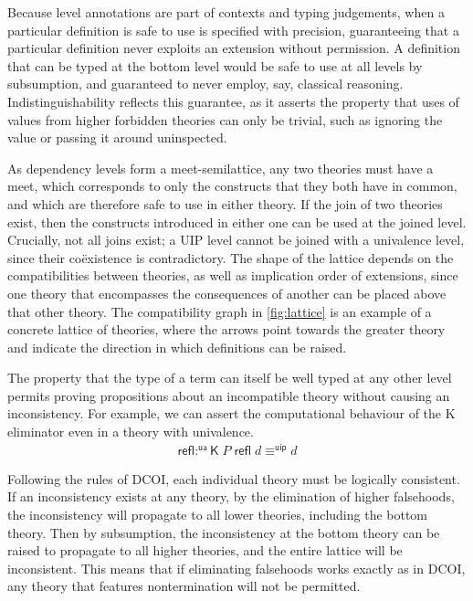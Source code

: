 \documentclass{article}
\newcommand{\kw}[1]{\mathsf{#1}}
\begin{document}
Because level annotations are part of contexts and typing judgements,
when a particular definition is safe to use is specified with precision,
guaranteeing that a particular definition never exploits an extension without permission.
A definition that can be typed at the bottom level
would be safe to use at all levels by subsumption,
and guaranteed to never employ, say, classical reasoning.
Indistinguishability reflects this guarantee, as it asserts the property that
uses of values from higher forbidden theories can only be trivial,
such as ignoring the value or passing it around uninspected.

As dependency levels form a meet-semilattice,
any two theories must have a meet,
which corresponds to only the constructs that they both have in common,
and which are therefore safe to use in either theory.
If the join of two theories exist,
then the constructs introduced in either one can be used at the joined level.
Crucially, not all joins exist; a UIP level cannot be joined with a univalence level,
since their co\"existence is contradictory.
The shape of the lattice depends on the compatibilities between theories,
as well as implication order of extensions,
since one theory that encompasses the consequences of another
can be placed above that other theory.
The compatibility graph in \cref{fig:lattice}
is an example of a concrete lattice of theories,
where the arrows point towards the greater theory
and indicate the direction in which definitions can be raised.

The property that the type of a term can itself be well typed at any other level
permits proving propositions about an incompatible theory
without causing an inconsistency.
For example, we can assert the computational behaviour of the K eliminator
even in a theory with univalence.
%
\vspace{-\baselineskip}
\begin{align*}
  \kw{refl} :^{\kw{ua}} \kw{K} \; P \; \kw{refl} \; d \equiv^{\kw{uip}} d
\end{align*}
\vspace{-1.5\baselineskip}

Following the rules of DCOI,
each individual theory must be logically consistent.
If an inconsistency exists at any theory,
by the elimination of higher falsehoods,
the inconsistency will propagate to all lower theories, including the bottom theory.
Then by subsumption, the inconsistency at the bottom theory
can be raised to propagate to all higher theories,
and the entire lattice will be inconsistent.
This means that if eliminating falsehoods works exactly as in DCOI,
any theory that features nontermination will not be permitted.
\end{document}
